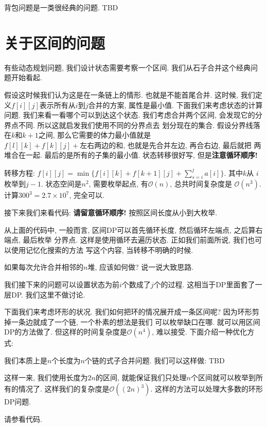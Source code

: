 背包问题是一类很经典的问题. TBD 

\section{关于区间的问题}

有些动态规划问题, 我们设计状态需要考察一个区间. 我们从石子合并这个经典问题开始看起. 

 假设这时候我们认为这是在一条链上的情形. 也就是不能首尾合并.
这时候, 我们定义$f[i][j]$表示所有从$i$到$j$合并的方案, 
属性是最小值. 下面我们来考虑状态的计算问题. 我们来看一看哪个可以到达这个状态. 
我们考虑合并两个区间, 会发现它的分界点不同. 所以这就启发我们使用不同的分界点去
划分现在的集合. 假设分界线落在$k$和$k+1$之间, 那么它需要的体力最小值就是
$f[l][k]+f[k][j]+\text{左右两边的和}$, 也就是先合并左边, 再合右边, 最后就把
两堆合在一起.  最后的是所有的子集的最小值. 状态转移很好写, 但是\textbf{注意循环顺序!}

转移方程: $f[i][j] = \min\{f[i][k]+f[k+1][j]+\sum_{s=i}^j a[i]\}$. 其中$k$从
$i$枚举到$j-1$. 状态空间是$n^2$, 需要枚举起点, 有$\mathcal O(n)$, 总共时间复杂度是
$\mathcal O(n^3)$. 计算$300^3=2.7\times 10^7$, 完全可以. 

接下来我们来看代码: \textbf{请留意循环顺序! } 按照区间长度从小到大枚举. 

从上面的代码中, 一般而言, 区间DP可以首先循环长度, 然后循环左端点, 之后算右端点, 最后枚举
分界点. 这样是使用循环去遍历状态. 正如我们前面所说, 我们也可以使用记忆化搜索的方法
写这个内容, 当转移不明确的时候. 

\begin{ques}
    如果每次允许合并相邻的$n$堆, 应该如何做? 说一说大致思路. 
\end{ques}

我们接下来的问题可以设置状态为前$i$个数成了$j$个的过程. 这相当于DP里面套了一层DP. 
我们这里不做讨论. 

 下面我们来考虑环形的状况. 我们如何把环的情况展开成一条区间呢? 
因为环形剪掉一条边就成了一个链, 一个朴素的想法是我们
可以枚举缺口在哪. 就可以用区间DP的方法做了. 但这样的时间复杂度是$\mathcal O(n^4)$,
难以接受. 下面介绍一种优化方式: 

我们本质上是$n$个长度为$n$个链的式子合并问题. 我们可以这样做: TBD

这样一来, 我们使用长度为$2n$的区间, 就能保证我们只处理$n$个区间就可以枚举到所有的情况了. 
这样我们的复杂度是$\mathcal O((2n)^3)$. 这样的方法可以处理大多数的环形DP问题. 

请参看代码. 

